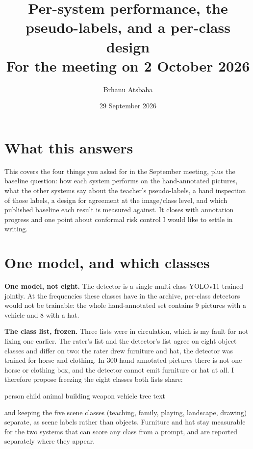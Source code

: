 \documentclass[11pt,a4paper]{article}
\title{\vspace{-1.5cm}Per-system performance, the pseudo-labels, and a per-class design\\[2pt]
\large For the meeting on 2 October 2026}
\author{Brhanu Atsbaha}
\date{29 September 2026}
\begin{document}
\maketitle
\vspace{-0.7cm}

\section*{What this answers}

This covers the four things you asked for in the September meeting, plus the baseline question: how
each system performs on the hand-annotated pictures, what the other systems say about the teacher's pseudo-labels, a hand
inspection of those labels, a design for agreement at the image/class level, and which published
baseline each result is measured against. It closes with
annotation progress and one point about conformal risk control I would like to settle in writing.

\section{One model, and which classes}

\textbf{One model, not eight.} The detector is a single multi-class YOLOv11 trained jointly. At the
frequencies these classes have in the archive, per-class detectors would not be trainable: the whole
hand-annotated set contains 9 pictures with a vehicle and 8 with a hat.

\textbf{The class list, frozen.} Three lists were in circulation, which is my fault for not fixing one
earlier. The rater's list and the detector's list agree on eight object classes and differ on two: the
rater drew furniture and hat, the detector was trained for horse and clothing. In 300 hand-annotated
pictures there is not one horse or clothing box, and the detector cannot emit furniture or hat at all.
I therefore propose freezing the eight classes both lists share:

\begin{center}
person \quad child \quad animal \quad building \quad weapon \quad vehicle \quad tree \quad text
\end{center}

and keeping the five scene classes (teaching, family, playing, landscape, drawing) separate, as scene
labels rather than objects. Furniture and hat stay measurable for the two systems that can score any
class from a prompt, and are reported separately where they appear.
\end{document}
